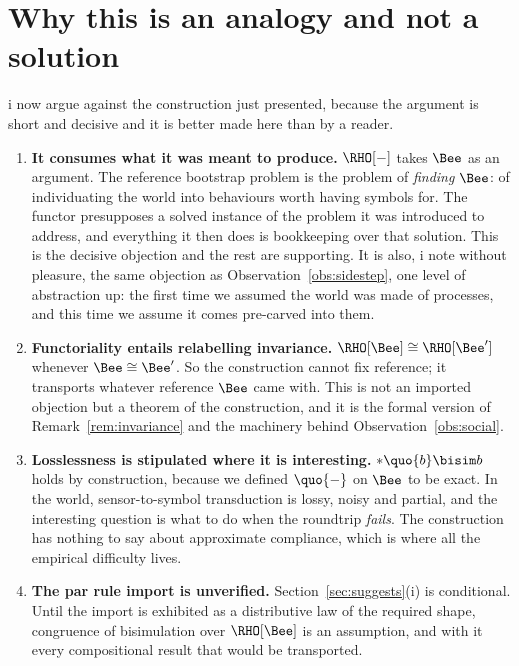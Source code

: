 \section{Why this is an analogy and not a solution}
\label{sec:notasolution}

i now argue against the construction just presented, because the
argument is short and decisive and it is better made here than by a
reader.

\begin{enumerate}[label=\textbf{(\alph*)},leftmargin=2.4em]

\item \textbf{It consumes what it was meant to produce.}
$\RHO[-]$ takes $\Bee$ as an argument.
The reference bootstrap problem is the problem of \emph{finding}
$\Bee$: of individuating the world into behaviours worth having
symbols for.
The functor presupposes a solved instance of the problem it was
introduced to address, and everything it then does is bookkeeping
over that solution.
This is the decisive objection and the rest are supporting.
It is also, i note without pleasure, the same objection as
Observation~\ref{obs:sidestep}, one level of abstraction up: the
first time we assumed the world was made of processes, and this
time we assume it comes pre-carved into them.

\item \textbf{Functoriality entails relabelling invariance.}
$\RHO[\Bee] \cong \RHO[\Bee']$ whenever $\Bee \cong \Bee'$.
So the construction cannot fix reference; it transports whatever
reference $\Bee$ came with.
This is not an imported objection but a theorem of the
construction, and it is the formal version of
Remark~\ref{rem:invariance} and the machinery behind
Observation~\ref{obs:social}.

\item \textbf{Losslessness is stipulated where it is interesting.}
$*\quo{b} \bisim b$ holds by construction, because we defined
$\quo{-}$ on $\Bee$ to be exact.
In the world, sensor-to-symbol transduction is lossy, noisy and
partial, and the interesting question is what to do when the
roundtrip \emph{fails}.
The construction has nothing to say about approximate compliance,
which is where all the empirical difficulty lives.

\item \textbf{The par rule import is unverified.}
Section~\ref{sec:suggests}(i) is conditional.
Until the import is exhibited as a distributive law of the required
shape, congruence of bisimulation over $\RHO[\Bee]$ is an
assumption, and with it every compositional result that would be
transported.


\end{enumerate}
